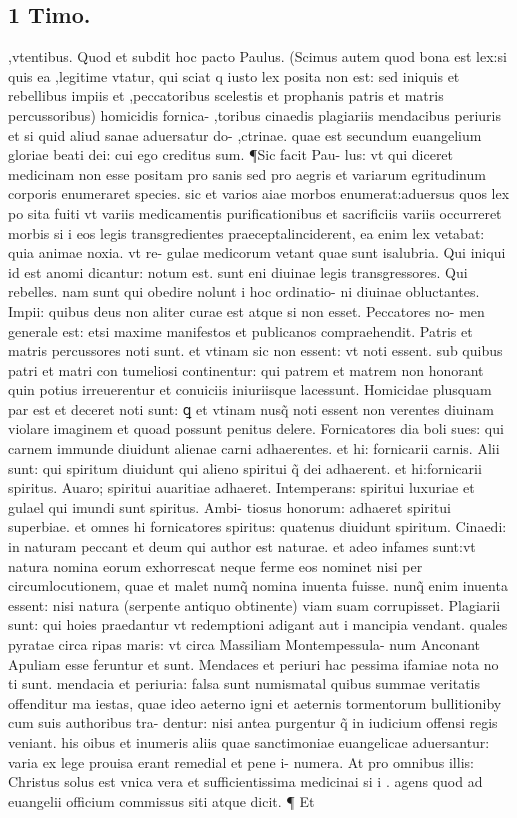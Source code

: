 \documentclass{article}
\begin{document}
\begin{pages}
\section*{1 Timo. }
\marginpar{[ p.202 ]}\pstart ,vtentibus. Quod et subdit hoc pacto Paulus. (Scimus autem quod bona est lex:si quis ea ,legitime vtatur, qui sciat q iusto lex posita non est: sed iniquis et rebellibus impiis et ,peccatoribus scelestis et prophanis patris et matris percussoribus) homicidis fornica- ,toribus cinaedis plagiariis mendacibus periuris et si quid aliud sanae aduersatur do- ,ctrinae. quae est secundum euangelium gloriae beati dei: cui ego creditus sum. ¶Sic facit Pau- lus: vt qui diceret medicinam non esse positam pro sanis sed pro aegris et variarum egritudinum corporis enumeraret species. sic et varios aiae morbos enumerat:aduersus quos lex po sita fuiti vt variis medicamentis purificationibus et sacrificiis variis occurreret morbis  si i eos legis transgredientes praeceptalinciderent, ea enim lex vetabat: quia animae noxia. vt re- gulae medicorum vetant quae sunt isalubria. Qui iniqui id est anomi dicantur: notum est. sunt eni diuinae legis transgressores. Qui rebelles. nam sunt qui obedire nolunt i hoc ordinatio- ni diuinae obluctantes. Impii: quibus deus non aliter curae est atque si non esset. Peccatores no- men generale est: etsi maxime manifestos et publicanos compraehendit. Patris et matris percussores noti sunt. et vtinam sic non essent: vt noti essent. sub quibus patri et matri con tumeliosi continentur: qui patrem et matrem non honorant quin potius irreuerentur et conuiciis  iniuriisque lacessunt. Homicidae plusquam par est et deceret noti sunt: ꝗ et vtinam nusq̃ noti essent  non verentes diuinam violare imaginem et quoad possunt penitus delere. Fornicatores dia boli sues: qui carnem immunde diuidunt alienae carni adhaerentes. et hi: fornicarii carnis. Alii sunt: qui spiritum diuidunt qui alieno spiritui q̃ dei adhaerent. et hi:fornicarii spiritus. Auaro; spiritui auaritiae adhaeret. Intemperans: spiritui luxuriae et gulael qui imundi sunt spiritus. Ambi- tiosus honorum: adhaeret spiritui superbiae. et omnes hi fornicatores spiritus: quatenus diuidunt spiritum. Cinaedi: in naturam peccant et deum qui author est naturae. et adeo infames sunt:vt natura nomina eorum exhorrescat neque ferme eos nominet nisi per circumlocutionem, quae et malet numq̃ nomina inuenta fuisse. nunq̃ enim inuenta essent: nisi natura (serpente antiquo obtinente) viam suam corrupisset. Plagiarii sunt: qui hoies praedantur vt redemptioni adigant aut i mancipia vendant. quales pyratae circa ripas maris: vt circa Massiliam Montempessula- num Anconant Apuliam esse feruntur et sunt. Mendaces et periuri hac pessima ifamiae nota no ti sunt. mendacia et periuria: falsa sunt numismatal quibus summae veritatis offenditur ma iestas, quae ideo aeterno igni et aeternis tormentorum bullitioniby cum suis authoribus tra- dentur: nisi antea purgentur q̃ in iudicium offensi regis veniant. his oibus et inumeris aliis quae sanctimoniae euangelicae aduersantur: varia ex lege prouisa erant remedial et pene i- numera. At pro omnibus illis: Christus solus est vnica vera et sufficientissima medicinai si i . agens quod ad euangelii officium commissus siti atque dicit. ¶ Et 
\end{pages}
\end{document}
